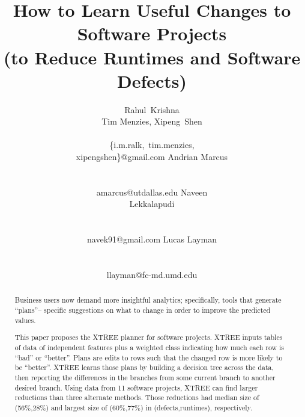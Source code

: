 \documentclass{sig-alternate}
\begin{document}
  


\title{How to Learn Useful Changes to Software Projects\\(to Reduce Runtimes and Software Defects)}
\author{  
\alignauthor
Rahul~Krishna\\Tim Menzies, Xipeng~Shen \\
       \\
       {\{i.m.ralk,~tim.menzies,\\xipengshen\}@gmail.com}
\alignauthor
Andrian Marcus \\
        \\ 
       \\ 
       {amarcus@utdallas.edu}
       \alignauthor
Naveen  \\ Lekkalapudi\\
  \\ 
       \\ 
       {navek91@gmail.com}
\alignauthor
Lucas Layman \\
        \\ 
       \\ 
       {llayman@fc-md.umd.edu}
\setlength{\columnsep}{7mm}
}
\maketitle
\begin{abstract}
 Business users now demand more insightful
 analytics; specifically, tools that generate ``plans''--
  specific suggestions on  what to change  in order to
 improve  the predicted values.
 
 This paper proposes  the  XTREE planner for software projects. 
XTREE inputs tables of data of independent features plus a   weighted class
  indicating how much each row is  ``bad'' or  ``better''. 
  Plans are edits to  
rows such that the changed row is more likely to be ``better''.  XTREE
learns those plans by building a decision tree across the data, then reporting
the differences in the branches from some current branch to another desired branch.
Using data from 11 software projects,  XTREE can find  larger reductions than three
alternate methods.  Those reductions had 
median size of (56\%,28\%) and   largest size of (60\%,77\%) in
(defects,runtimes), respectively.
\end{abstract}
\end{document}
